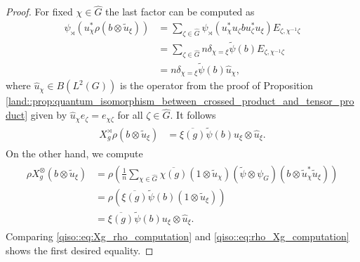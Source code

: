 \documentclass{amsart}
\theoremstyle{definition}
\theoremstyle{definition}
\begin{document}
\begin{proof}
    For fixed $\chi \in \hat{G}$ the last factor can be computed as
    \begin{align*}
        \psi_\rtimes(u_\chi^\ast \rho(b \otimes \tilde{u}_\xi))
            &= \sum_{\zeta \in \hat{G}} \psi_\rtimes(u_\chi^\ast u_\zeta b u_\zeta^\ast u_\xi) E_{\zeta, \chi^{-1} \zeta} \\
            &= \sum_{\zeta \in \hat{G}} n \delta_{\chi = \xi} \tilde{\psi}(b) E_{\zeta, \chi^{-1} \zeta} \\
            &= n \delta_{\chi = \xi} \tilde{\psi}(b) \hat{u}_\chi,
    \end{align*}
    where $\hat{u}_\chi \in B(L^2(G))$ is the operator from the proof of Proposition \ref{land::prop:quantum_isomorphism_between_crossed_product_and_tensor_product} given by $\hat{u}_\chi e_\zeta = e_{\chi \zeta}$ for all $\zeta \in \hat{G}$.
    It follows
    \begin{align}
        \label{qiso::eq:Xg_rho_computation}
        \begin{aligned}
        X_g^\rtimes \rho(b \otimes \tilde{u}_\xi) 
            &= \overline{\xi(g)} \tilde{\psi}(b) u_\xi \otimes \hat{u}_\xi.
        \end{aligned}
    \end{align}
    On the other hand, we compute
    \begin{align}
        \label{qiso::eq:rho_Xg_computation}
        \begin{aligned}
        \rho X_g^\otimes(b \otimes \tilde{u}_\xi) 
            &= \rho \left( \frac{1}{n} \sum_{\chi \in \hat{G}} \overline{\chi(g)} (1 \otimes \tilde{u}_\chi) (\tilde{\psi} \otimes \psi_G)(b \otimes \tilde{u}_\chi^\ast \tilde{u}_\xi)  \right) \\
            &=  \rho \left( \overline{\xi(g)} \tilde{\psi}(b) (1 \otimes \tilde{u}_\xi) \right) \\
            &= \overline{\xi(g)} \tilde{\psi}(b) u_\xi \otimes \hat{u}_\xi.
        \end{aligned}
    \end{align}
    Comparing \eqref{qiso::eq:Xg_rho_computation} and \eqref{qiso::eq:rho_Xg_computation} shows the first desired equality.


\end{proof}
\end{document}
